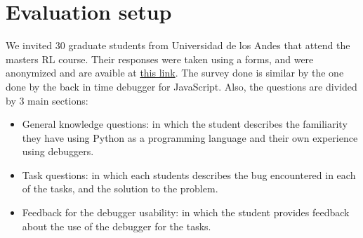\section{Evaluation setup}
\label{sec:evaluation}
We invited 30 graduate students from Universidad de los Andes that attend the masters \ac{RL} course. Their 
responses were taken using a forms, and were anonymized and are avaible at \href{https://uniandes-my.sharepoint.com/:x:/g/personal/la_rodriguez_uniandes_edu_co/ESDy89Q-PgVBpYHEZ_CDh_IBhjhS35VFqNrlEjVw_ShY1w?e=lm319K}{this link}. 
The survey done is similar by the one done by the back in time debugger for JavaScript\cite{delorean23}. Also, the
questions are divided by 3 main sections:
\begin{itemize}
\item General knowledge questions: in which the student describes the familiarity they have using Python as a
programming language and their own experience using debuggers.
\item Task questions: in which each students describes the bug encountered in each of the tasks, and the solution 
 to the problem.
\item Feedback for the debugger usability: in which the student provides feedback about the use of the debugger 
for the tasks.
\end{itemize}



\endinput

